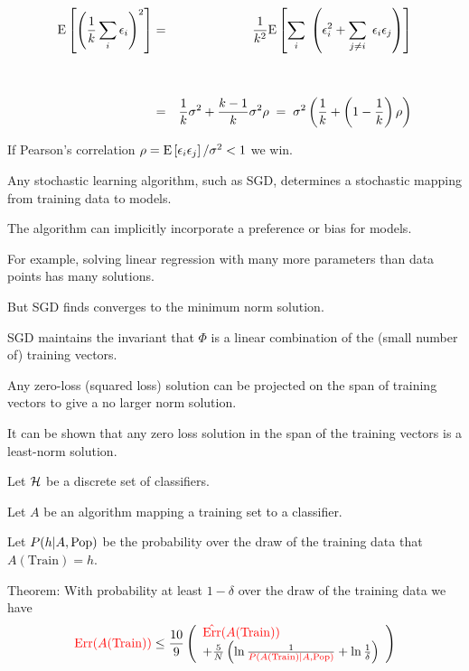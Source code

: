 {{\begin{eqnarray*}
  \mathrm{E}\left[\left(\frac{1}{k} \sum_i \epsilon_i\right)^2\right] & = & \frac{1}{k^2} \mathrm{E}\left[\sum_i\;\left(\epsilon_i^2 + \sum_{j \not = i}\;\epsilon_i\epsilon_j\right)\right] \\
  \\
  \\
  & = & \frac{1}{k} \sigma^2 + \frac{k-1}{k} \sigma^2\rho \;=\; \sigma^2\left(\frac{1}{k} + \left(1-\frac{1}{k}\right)\rho\right)
\end{eqnarray*}

\vfill
If Pearson's correlation $\rho = \mathrm{E}\left[\epsilon_i\epsilon_j\right]/\sigma^2 < 1$ we win.
}



Any stochastic learning algorithm, such as SGD, determines a stochastic mapping from training data to models.

\vfill
The algorithm can implicitly incorporate a preference or bias for models.

\vfill
For example, solving linear regression with many more parameters than data points
has many solutions.

\vfill
But SGD finds converges to the minimum norm solution.


SGD maintains the invariant that $\Phi$ is a linear combination of the (small number of) training vectors.

\vfill
Any zero-loss (squared loss) solution can be projected on the span of training vectors to give a no larger norm solution.

\vfill
It can be shown that any zero loss solution in the span of the training vectors is a least-norm solution.


Let ${\cal H}$ be a discrete set of classifiers.

\vfill
Let $A$ be an algorithm mapping a training set to a classifier.

\vfill
Let $P(h | A,\mathrm{Pop})$ be the probability over the draw of the training data that $A(\mathrm{Train}) = h$.

\vfill
Theorem: With probability at least $1-\delta$ over the draw of the training data we have
$${\color{red} \mathrm{Err}(A(\mathrm{Train}))} \leq \frac{10}{9}\left(\begin{array}{l} {\color{red} \hat{\mathrm{Err}}(A(\mathrm{Train}))}
 \\+ \frac{5}{N}\left(
\ln \frac{1}{{\color{red} P(A(\mathrm{Train})|A,\mathrm{Pop})}} + \ln \frac{1}{\delta}\right)\end{array}\right)$$


}
